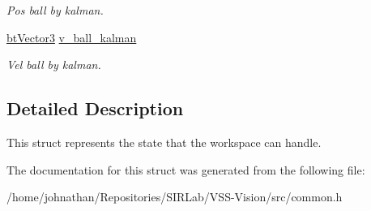 \begin{DoxyCompactItemize}
\begin{DoxyCompactList}\small\item\em Pos ball by kalman. \end{DoxyCompactList}\item 
\hyperlink{structcommon_1_1btVector3}{bt\+Vector3} \hyperlink{structcommon_1_1State_adc2d51526dffd90f889324c90fa082a0}{v\+\_\+ball\+\_\+kalman}\hypertarget{structcommon_1_1State_adc2d51526dffd90f889324c90fa082a0}{}\label{structcommon_1_1State_adc2d51526dffd90f889324c90fa082a0}

\begin{DoxyCompactList}\small\item\em Vel ball by kalman. \end{DoxyCompactList}\end{DoxyCompactItemize}


\subsection{Detailed Description}
This struct represents the state that the workspace can handle. 

The documentation for this struct was generated from the following file\+:\begin{DoxyCompactItemize}
\item 
/home/johnathan/\+Repositories/\+S\+I\+R\+Lab/\+V\+S\+S-\/\+Vision/src/common.\+h\end{DoxyCompactItemize}
